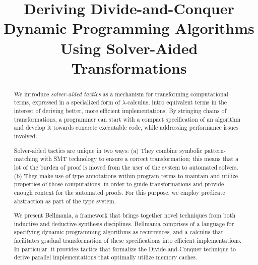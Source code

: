\documentclass[pldi,preprint]{sigplanconf-pldi16}
\newcommand\newterm[1]{{\it #1}}
\begin{document}
\setlength{\pdfpageheight}{\paperheight}
\setlength{\pdfpagewidth}{\paperwidth}



\title{Deriving Divide-and-Conquer Dynamic Programming Algorithms Using 
  Solver-Aided Transformations}

           {}
           {}

\maketitle

\begin{abstract}
We introduce \newterm{solver-aided tactics} as a mechanism for transforming
computational terms, expressed in a specialized form of $\lambda$-calculus,
intro equivalent terms in the interest of deriving better, more efficient
implementations. By stringing chains of transformations, a programmer can start
with a compact specification of an algorithm and develop it towards concrete
executable code, while addressing performance issues involved.

Solver-aided tactics are unique in two ways: 
(a) They combine symbolic pattern-matching
with SMT technology to ensure a correct transformation; this means that a lot of the
burden of proof is moved from the user of the system to automated solvers.
(b) They make use of type annotations within program terms to maintain and utilize
properties of those computations, in order to guide transformations and provide
enough context for the automated proofs. For this purpose, we employ predicate
abstraction as part of the type system.

We present Bellmania, a framework that brings together novel techniques from both
inductive and deductive synthesis disciplines.
Bellmania comprises of a language for specifying dynamic programming algorithms as recurrences,
and a calculus that facilitates gradual transformation of these 
specifications into efficient implementations.
In particular, it provides tactics that formalize the Divide-and-Conquer technique to derive
parallel implementations that optimally utilize memory caches.
\end{abstract}
\end{document}
